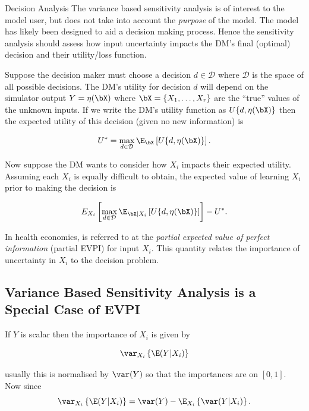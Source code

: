 \begin{chapter}{Decision Analysis \label{Ch:decision}}
The variance based sensitivity analysis is of interest to the model user, but does not take into account the \textit{purpose} of the model. The model has likely been designed to aid a decision making process. Hence the sensitivity analysis should assess how input uncertainty impacts the DM's final (optimal) decision and their utility/loss function.

Suppose the decision maker must choose a decision $d \in \mathcal{D}$ where $\mathcal{D}$ is the space of all possible decisions. The DM's utility for decision $d$ will depend on the simulator output $Y = \eta(\bX)$ where $\bX = \{X_1, \ldots, X_r \}$ are the ``true'' values of the unknown inputs. If we write the DM's utility function as $U\{ d, \eta(\bX) \}$ then the expected utility of this decision (given no new information) is

\begin{equation}
U^*  = \max_{d \in \mathcal{D}} \E_{\bX} \left[ U \{ d, \eta(\bX) \} \right].
\end{equation}

Now suppose the DM wants to consider how $X_i$ impacts their expected utility. Assuming each $X_i$ is equally difficult to obtain, the expected value of learning $X_i$ prior to making the decision is

\begin{equation}
E_{X_i} \left[ \max_{d \in \mathcal{D}} \E_{\bX | X_i} \left[ U \{ d, \eta(\bX) \} \right] \right] - U^*. \label{Eq:p-evpi}
\end{equation}

In health economics,  is referred to at the \textit{partial expected value of perfect information} (partial EVPI) for input $X_i$. This quantity relates the importance of uncertainty in $X_i$ to the decision problem.

\subsection{Variance Based Sensitivity Analysis is a Special Case of EVPI}

If $Y$ is scalar then the importance of $X_i$ is given by

\begin{equation}
	\var_{X_i} \left\{ \E( Y|X_i) \right\} \label{Eq:vbsa}
\end{equation}

usually this is normalised by $\var(Y)$ so that the importances are on $[0,1]$. Now since
\begin{equation}
\var_{X_i} \left\{ \E( Y|X_i) \right\} = \var(Y) - \E_{X_i} \left\{ \var(Y|X_i) \right\}.
\end{equation}


\end{chapter}
